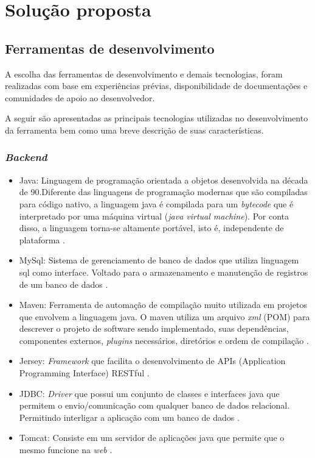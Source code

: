 \chapter{Solução proposta}

\section{Ferramentas de desenvolvimento}
A escolha das ferramentas de desenvolvimento e demais tecnologias, foram realizadas com base em experiências prévias, disponibilidade de documentações e comunidades de apoio ao desenvolvedor.

A seguir são apresentadas as principais tecnologias utilizadas no desenvolvimento da ferramenta bem como uma breve descrição de suas características.

\subsection{\textit{Backend}}

\begin{itemize}
	\item Java: Linguagem de programação orientada a objetos desenvolvida na década de 90.Diferente das linguagens de programação
		modernas que são compiladas para código nativo, a linguagem java é compilada para um \textit{bytecode} que é interpretado por uma máquina
		virtual (\textit{java virtual machine}). Por conta disso, a linguagem torna-se altamente portável, isto é, independente de plataforma \cite{java}.
	\item MySql: Sistema de gerenciamento de banco de dados que utiliza linguagem sql como interface. Voltado para o armazenamento e manutenção 
		de registros de um banco de dados \cite{mysql}.
	\item Maven: Ferramenta de automação de compilação muito utilizada em projetos que envolvem a linguagem java. O maven
		utiliza um arquivo \textit{xml} (POM) para descrever o projeto de software sendo implementado, suas dependências, componentes
		externos, \textit{plugins} necessários, diretórios e ordem de compilação \cite{maven}.
	\item Jersey: \textit{Framework} que facilita o desenvolvimento de APIs (Application Programming Interface) RESTful \cite{jersey}.
	\item JDBC: \textit{Driver} que possui um conjunto de classes e interfaces java que permitem o envio/comunicação com qualquer
		banco de dados relacional. Permitindo interligar a aplicação com um banco de dados \cite{jdbc}.
	\item Tomcat: Consiste em um servidor de aplicações java que permite que o mesmo funcione na \textit{web} \cite{tomcat}.

\end{itemize}

